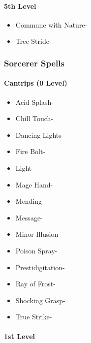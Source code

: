 \documentclass[
]{article}
\providecommand{\tightlist}{%
  \setlength{\itemsep}{0pt}\setlength{\parskip}{0pt}}
\begin{document}
\hypertarget{5th-level-4}{%
\paragraph{5th Level}\label{5th-level-4}}

\begin{itemize}
\tightlist
\item
  Commune with Nature-
\item
  Tree Stride-
\end{itemize}

\hypertarget{sorcerer-spells}{%
\subsubsection{Sorcerer Spells}\label{sorcerer-spells}}

\hypertarget{cantrips-0-level-3}{%
\paragraph{Cantrips (0 Level)}\label{cantrips-0-level-3}}

\begin{itemize}
\tightlist
\item
  Acid Splash-
\item
  Chill Touch-
\item
  Dancing Lights-
\item
  Fire Bolt-
\item
  Light-
\item
  Mage Hand-
\item
  Mending-
\item
  Message-
\item
  Minor Illusion-
\item
  Poison Spray-
\item
  Prestidigitation-
\item
  Ray of Frost-
\item
  Shocking Grasp-
\item
  True Strike-
\end{itemize}

\hypertarget{1st-level-5}{%
\paragraph{1st Level}\label{1st-level-5}}
\end{document}
